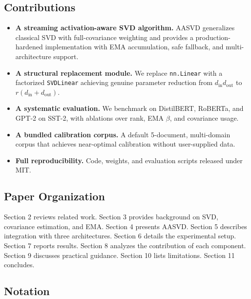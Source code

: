 \subsection{Contributions}

\begin{itemize}
\item \textbf{A streaming activation-aware SVD algorithm.} AASVD generalizes classical
  SVD with full-covariance weighting and provides a production-hardened
  implementation with EMA accumulation, safe fallback, and multi-architecture
  support.
\item \textbf{A structural replacement module.} We replace \texttt{nn.Linear} with a
  factorized \texttt{SVDLinear} achieving genuine parameter reduction from
  $d_\text{in} d_\text{out}$ to $r(d_\text{in} + d_\text{out})$.
\item \textbf{A systematic evaluation.} We benchmark on DistilBERT, RoBERTa, and GPT-2
  on SST-2, with ablations over rank, EMA $\beta$, and covariance usage.
\item \textbf{A bundled calibration corpus.} A default 5-document, multi-domain corpus
  that achieves near-optimal calibration without user-supplied data.
\item \textbf{Full reproducibility.} Code, weights, and evaluation scripts released
  under MIT.

\end{itemize}
\subsection{Paper Organization}

Section 2 reviews related work. Section 3 provides background on SVD, 
covariance estimation, and EMA. Section 4 presents AASVD. Section 5 
describes integration with three architectures. Section 6 details the 
experimental setup. Section 7 reports results. Section 8 analyzes the 
contribution of each component. Section 9 discusses practical guidance. 
Section 10 lists limitations. Section 11 concludes.



\subsection{Notation}
